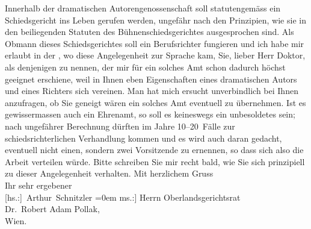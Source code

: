 \begin{ledgroupsized}[t]{13cm}
           Innerhalb der dramatischen Autorengenossenschaft
                    soll  statutengemäss ein Schiedsgericht ins
                    Leben gerufen werden, ungefähr nach den Prinzipien, wie sie in den beiliegenden
                    Statuten des Bühnenschiedsgerichtes ausgesprochen sind. Als Obmann dieses
                    Schiedsgerichtes soll ein Berufsrichter fungieren und ich habe mir erlaubt in
                    der \label{K_L02356_1v}\label{K_L02356_1h},
                    wo diese Angelegenheit zur Sprache kam, Sie, lieber Herr Doktor, als denjenigen
                    zu nennen, der mir für ein solches Amt schon dadurch höchst geeignet erschiene,
                    weil in Ihnen eben Eigenschaften eines dramatischen Autors und eines Richters
                    sich vereinen. Man hat mich ersucht unverbindlich bei Ihnen anzufragen, ob Sie
                    geneigt wären ein solches Amt eventuell zu übernehmen. Ist es gewissermassen
                    auch ein Ehrenamt, so soll es keineswegs ein unbesoldetes sein; nach ungefährer
                    Berechnung dürften im Jahre 10–20 Fälle zur schiedsrichterlichen Verhandlung
                    kommen und es wird auch daran gedacht, eventuell nicht einen, sondern zwei
                    Vorsitzende zu ernennen, so dass sich also die Arbeit verteilen würde. Bitte
                    schreiben Sie mir recht bald, wie Sie sich prinzipiell zu dieser Angelegenheit
                    verhalten.\pend
           \pstart
           Mit herzlichem Gruss{\\[\baselineskip]}Ihr sehr ergebener{\\[\baselineskip]}\spacefill\mbox{{[}hs.:{]} Arthur Schnitzler}\pend
           \leftskip=0em{}\pstart
           \noindent{}{[}ms.:{]} Herrn Oberlandsgerichtsrat{\\}Dr. Robert
                        Adam Pollak,{\\}Wien.\pend
           \endnumbering{}\end{ledgroupsized}  \newcommand{\dateiname}{L02356}\newcommand{\titel}{Arthur Schnitzler an Robert Adam, 28. 10. 1920}\newcommand{\editorInnen}{Martin Anton Müller und Gerd-Hermann Susen}
      